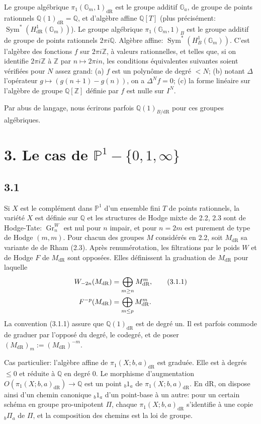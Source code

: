 \documentclass[10pt]{article}
\newcommand{\Q}{\mathbb Q}
\newcommand{\Z}{\mathbb Z}
\newcommand{\Gm}{\mathbb G_m}
\newcommand{\Ga}{\mathbb G_a}
\newcommand{\PP}{\mathbb P}
\newcommand{\Sym}{\operatorname{Sym}}
\newcommand{\Gr}{\operatorname{Gr}}
\newcommand{\dR}{\mathrm{dR}}
\begin{document}
Le groupe algébrique $\pi_1(\Gm,1)_{\dR}$ est le groupe additif $\Ga$, de groupe de points rationnels $\Q(1)_{\dR}=\Q$, et d'algèbre affine $\Q[T]$ (plus précisément: $\Sym^*(H^1_{\dR}(\Gm))$). Le groupe algébrique $\pi_1(\Gm,1)_B$ est le groupe additif de groupe de points rationnels $2\pi i\Q$. Algèbre affine: $\Sym^*(H^1_B(\Gm))$. C'est l'algèbre des fonctions $f$ sur $2\pi i\Z$, à valeurs rationnelles, et telles que, si on identifie $2\pi i\Z$ à $\Z$ par $n\mapsto2\pi in$, les conditions équivalentes suivantes soient vérifiées pour $N$ assez grand: (a) $f$ est un polynôme de degré $<N$; (b) notant $\Delta$ l'opérateur $g\mapsto(g(n+1)-g(n))$, on a $\Delta^Nf=0$; (c) la forme linéaire sur l'algèbre de groupe $\Q[\Z]$ définie par $f$ est nulle sur $I^N$.

Par abus de langage, nous écrirons parfois $\Q(1)_{B/\dR}$ pour ces groupes algébriques.

\section*{3. Le cas de $\PP^1-\{0,1,\infty\}$}
\subsection*{3.1}
Si $X$ est le complément dans $\PP^1$ d'un ensemble fini $T$ de points rationnels, la variété $X$ est définie sur $\Q$ et les structures de Hodge mixte de 2.2, 2.3 sont de Hodge-Tate: $\Gr^W_n$ est nul pour $n$ impair, et pour $n=2m$ est purement de type de Hodge $(m,m)$. Pour chacun des groupes $M$ considérés en 2.2, soit $M_{\dR}$ sa variante de de Rham (2.3). Après renumérotation, les filtrations par le poids $W$ et de Hodge $F$ de $M_{\dR}$ sont opposées. Elles définissent la graduation de $M_{\dR}$ pour laquelle
\begin{align}
 W_{-2n}(M_{\dR})&=\bigoplus_{m\geq n}M^m_{\dR},
\tag{3.1.1}\\
 F^{-p}(M_{\dR})&=\bigoplus_{m\leq p}M^m_{\dR}.
\notag
\end{align}
La convention (3.1.1) assure que $\Q(1)_{\dR}$ est de degré un. Il est parfois commode de graduer par l'opposé du degré, le codegré, et de poser $(M_{\dR})_m:=(M_{\dR})^{-m}$.

Cas particulier: l'algèbre affine de $\pi_1(X;b,a)_{\dR}$ est graduée. Elle est à degrés $\leq0$ et réduite à $\Q$ en degré $0$. Le morphisme d'augmentation $O(\pi_1(X;b,a)_{\dR})\to\Q$ est un point ${}_b1_a$ de $\pi_1(X;b,a)_{\dR}$. En $\dR$, on dispose ainsi d'un chemin canonique ${}_b1_a$ d'un point-base à un autre: pour un certain schéma en groupe pro-unipotent $\Pi$, chaque $\pi_1(X;b,a)_{\dR}$ s'identifie à une copie ${}_b\Pi_a$ de $\Pi$, et la composition des chemins est la loi de groupe.
\end{document}
